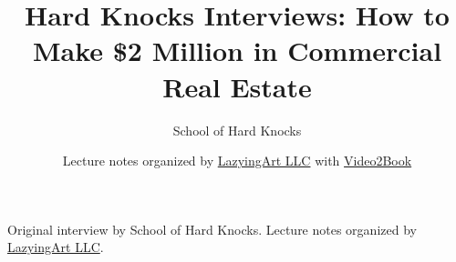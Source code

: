 \documentclass[11pt,oneside]{book}
\begin{document}
\frontmatter
\title{Hard Knocks Interviews: How to Make \$2 Million in Commercial Real Estate}
\author{School of Hard Knocks}
\date{Lecture notes organized by \href{https://lazying.art}{LazyingArt LLC} with \href{https://github.com/lachlanchen/Video2Book}{Video2Book}}
\maketitle
\begin{center}
\small Original interview by School of Hard Knocks. Lecture notes organized by \href{https://lazying.art}{LazyingArt LLC}.
\end{center}
\clearpage
\mainmatter

\end{document}
